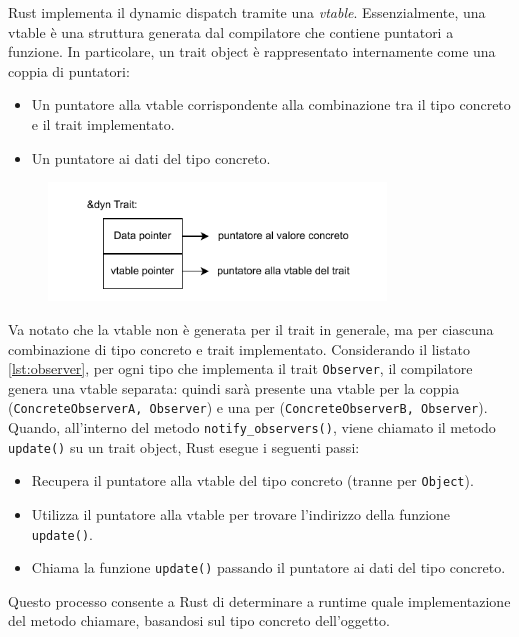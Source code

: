 Rust implementa il dynamic dispatch tramite una \textit{vtable}. Essenzialmente, una vtable è una struttura generata dal compilatore che contiene puntatori a funzione. In particolare, un trait object è rappresentato internamente come una coppia di puntatori: 
\begin{itemize}
    \item Un puntatore alla vtable corrispondente alla combinazione tra il tipo concreto e il trait implementato.
    \item Un puntatore ai dati del tipo concreto.
\end{itemize}
\begin{figure}[H]
    \centering
    \includegraphics[width=0.8\textwidth]{Figures/vtable.drawio.pdf}
\end{figure}
Va notato che la vtable non è generata per il trait in generale, ma per ciascuna combinazione di tipo concreto e trait implementato. Considerando il listato \ref{lst:observer}, per ogni tipo che implementa il trait \texttt{Observer}, il compilatore genera una vtable separata: quindi sarà presente una vtable per la coppia (\texttt{ConcreteObserverA, Observer}) e una per (\texttt{ConcreteObserverB, Observer}). Quando, all'interno del metodo \texttt{notify\_observers()}, viene chiamato il metodo \texttt{update()} su un trait object, Rust esegue i seguenti passi:
\begin{itemize}
    \item Recupera il puntatore alla vtable del tipo concreto (tranne per \texttt{Object}).
    \item Utilizza il puntatore alla vtable per trovare l'indirizzo della funzione \texttt{update()}.
    \item Chiama la funzione \texttt{update()} passando il puntatore ai dati del tipo concreto.
\end{itemize}
Questo processo consente a Rust di determinare a runtime quale implementazione del metodo chiamare, basandosi sul tipo concreto dell'oggetto. 

